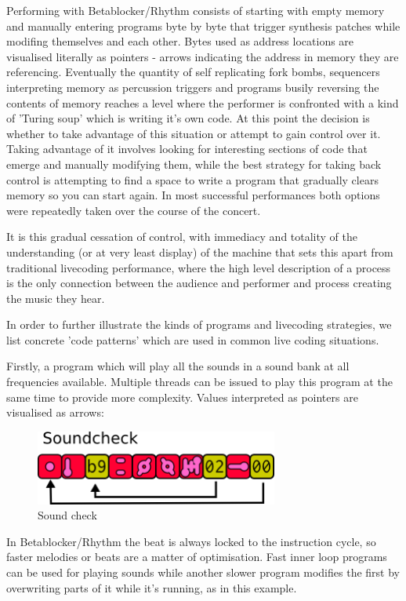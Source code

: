 \documentclass[letterpaper, 12pt]{article}
\begin{document}
Performing with Betablocker/Rhythm consists of starting with empty memory and manually entering programs byte by byte that trigger synthesis patches while modifing themselves and each other. Bytes used as address locations are visualised literally as pointers - arrows indicating the address in memory they are referencing. 
Eventually the quantity of self replicating fork bombs, sequencers interpreting memory as percussion triggers and programs busily reversing the contents of memory reaches a level where the performer is confronted with a kind of 'Turing soup' which is writing it's own code. 
At this point the decision is whether to take advantage of this situation or attempt to gain control over it.
Taking advantage of it involves looking for interesting sections of code that emerge and manually modifying them, while the best strategy for taking back control is attempting to find a space to write a program that gradually clears memory so you can start again. 
In most successful performances both options were repeatedly taken over the course of the concert.

It is this gradual cessation of control, with immediacy and totality of the understanding (or at very least display) of the machine that sets this apart from traditional livecoding performance, where the high level description of a process is the only connection between the audience and performer and process creating the music they hear.

In order to further illustrate the kinds of programs and livecoding strategies, we list concrete 'code patterns' which are used in common live coding situations.

Firstly, a program which will play all the sounds in a sound bank at all frequencies available. 
Multiple threads can be issued to play this program at the same time to provide more complexity. 
Values interpreted as pointers are visualised as arrows:

\begin{figure}[H]
	\centering
		\includegraphics[width=8cm]{bbds-sndchk1}
	\caption{Sound check}
	\label{fig:fig_bbds-sndchk1}
\end{figure}

In Betablocker/Rhythm the beat is always locked to the instruction cycle, so faster melodies or beats are a matter of optimisation. Fast inner loop programs can be used for playing sounds while another slower program modifies the first by overwriting parts of it while it's running, as in this example. 
\end{document}
